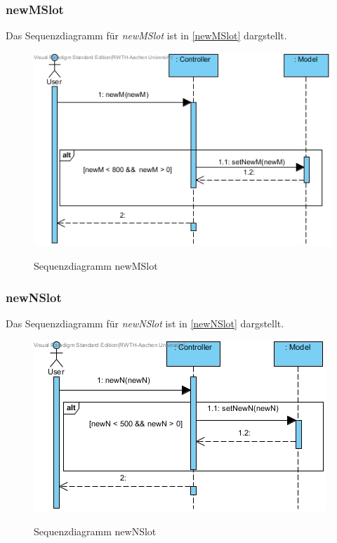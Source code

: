 \subsubsection*{newMSlot}

Das Sequenzdiagramm für \emph{newMSlot} ist in \ref{newMSlot} dargstellt.

\begin{figure}[H]
	\centering
	\includegraphics[scale=.6]{Bilder/Controller__newMSlot().jpg}\\
	\caption{Sequenzdiagramm newMSlot}
	\label{Sequenzdiagramm newMSlot}
\end{figure}

\subsubsection*{newNSlot}

Das Sequenzdiagramm für \emph{newNSlot} ist in \ref{newNSlot} dargstellt.

\begin{figure}[H]
	\centering
	\includegraphics[scale=.6]{Bilder/Controller__newNSlot().jpg}\\
	\caption{Sequenzdiagramm newNSlot}
	\label{Sequenzdiagramm newNSlot}
\end{figure}

